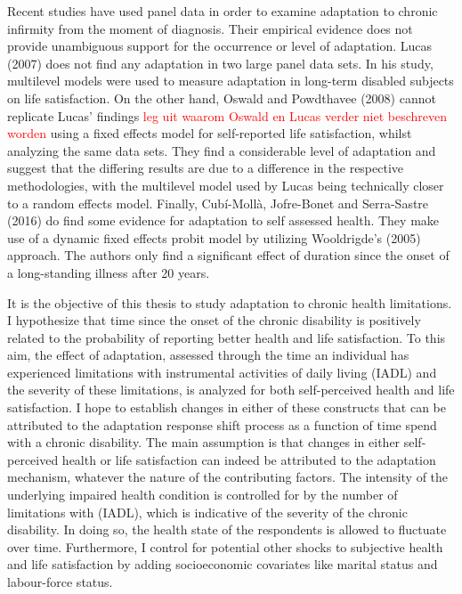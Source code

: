 \documentclass[12pt]{article}
\begin{document}
Recent studies have used panel data in order to examine adaptation to chronic infirmity from the moment of diagnosis. Their empirical evidence does not provide unambiguous support for the occurrence or level of adaptation. Lucas (2007) does not find any adaptation in two large panel data sets. In his study, multilevel models were used to measure adaptation in long-term disabled subjects on life satisfaction. On the other hand, Oswald and Powdthavee (2008) cannot replicate Lucas' findings \textcolor{red}{leg uit waarom Oswald en Lucas verder niet beschreven worden} using a fixed effects model for self-reported life satisfaction, whilst analyzing the same data sets. They find a considerable level of adaptation and suggest that the differing results are due to a difference in the respective methodologies, with the multilevel model used by Lucas being technically closer to a random effects model. Finally, Cub\'i-Moll\`a, Jofre-Bonet and Serra-Sastre (2016) do find some evidence for adaptation to self assessed health. They make use of a dynamic fixed effects probit model by utilizing Wooldrigde's (2005) approach. The authors only find a significant effect of duration since the onset of a long-standing illness after 20 years.  

It is the objective of this thesis to study adaptation to chronic health limitations. I hypothesize that time since the onset of the chronic disability is positively related to the probability of reporting better health and life satisfaction. To this aim, the effect of adaptation, assessed through the time an individual has experienced limitations with instrumental activities of daily living (IADL) and the severity of these limitations, is analyzed for both self-perceived health and life satisfaction. I hope to establish changes in either of these constructs that can be attributed to the adaptation response shift process as a function of time spend with a chronic disability. The main assumption is that changes in either self-perceived health or life satisfaction can indeed be attributed to the adaptation mechanism, whatever the nature of the contributing factors. The intensity of the underlying impaired health condition is controlled for by the number of limitations with (IADL), which is indicative of the severity of the chronic disability. In doing so, the health state of the respondents is allowed to fluctuate over time. Furthermore, I control for potential other shocks to subjective health and life satisfaction by adding socioeconomic covariates like marital status and labour-force status.   
\end{document}

